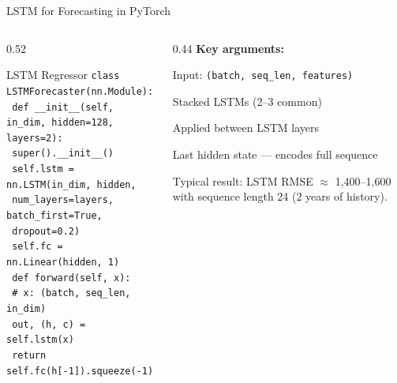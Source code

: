 \documentclass[aspectratio=169, 11pt]{beamer}
\begin{document}
\begin{frame}{LSTM for Forecasting in PyTorch}
  \begin{columns}[T]
    \begin{column}{0.52\textwidth}
      \begin{examplebox}{LSTM Regressor}
        {\footnotesize
        \texttt{class LSTMForecaster(nn.Module):}\\
        \texttt{  def \_\_init\_\_(self, in\_dim, hidden=128, layers=2):}\\
        \texttt{    super().\_\_init\_\_()}\\
        \texttt{    self.lstm = nn.LSTM(in\_dim, hidden,}\\
        \texttt{      num\_layers=layers, batch\_first=True,}\\
        \texttt{      dropout=0.2)}\\
        \texttt{    self.fc = nn.Linear(hidden, 1)}\\[2pt]
        \texttt{  def forward(self, x):}\\
        \texttt{    \# x: (batch, seq\_len, in\_dim)}\\
        \texttt{    out, (h, c) = self.lstm(x)}\\
        \texttt{    return self.fc(h[-1]).squeeze(-1)}
        }
      \end{examplebox}
    \end{column}
    \begin{column}{0.44\textwidth}
      \textbf{Key arguments:}
      \begin{description}\small
        \item[\texttt{batch\_first=True}] Input: \texttt{(batch, seq\_len, features)}
        \item[\texttt{num\_layers}] Stacked LSTMs (2--3 common)
        \item[\texttt{dropout}] Applied between LSTM layers
        \item[\texttt{h[-1]}] Last hidden state --- encodes full sequence
      \end{description}
      \vspace{0.1cm}
      \begin{keybox}
        \small Typical result: LSTM RMSE $\approx$ 1,400--1,600
        with sequence length 24 (2 years of history).
      \end{keybox}
    \end{column}
  \end{columns}
\end{frame}
\end{document}
